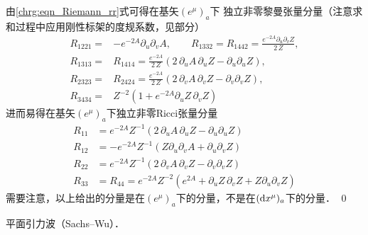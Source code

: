 \noindent {}
由\eqref{chrg:eqn_Riemann_rr}式可得在基矢$(e^\mu)_a$下
独立非零黎曼张量分量（注意求和过程中应用刚性标架的度规系数，见部分）
\begin{align*}
  R_{1221} =& -e^{-2 A} \partial_u\partial_v A, \qquad
  R_{1332} = R_{1442} = \frac{e^{-2A} \partial_u \partial_v Z }{{2}\, Z}, \\
  R_{1313} =& R_{1414}= \frac{e^{-2A}}{{2}\, Z} (2\, \partial_u A \,
    \partial_u Z  - \partial_u \partial_u Z ),  \\
  R_{2323} =& R_{2424} = \frac{e^{-2A}}{{2}\, Z}
    (2\, \partial_v A \, \partial_v Z - \partial_v \partial_v Z ),  \\
  R_{3434} =& Z^{-2} (1+ e^{-2A} \partial_u Z \,\partial_v Z )
\end{align*}
进而易得在基矢$(e^\mu)_a$下独立非零Ricci张量分量
\begin{align*}
  R_{11} &= e^{-2A} Z^{-1} ( 2\,\partial_u A \,\partial_u Z - \partial_u \partial_u Z)  \\
  R_{12} &=-e^{-2A} Z^{-1} ( Z\partial_u\partial_v A + \partial_u \partial_v Z )  \\
  R_{22} &= e^{-2A} Z^{-1} ( 2\,\partial_v A \,\partial_v Z - \partial_v \partial_v Z)  \\
  R_{33} &= R_{44}=e^{-2A}Z^{-2}(e^{2A}+\partial_u Z \,\partial_v Z + Z\partial_u \partial_v Z)
\end{align*}
需要注意，以上给出的分量是在$(e^\mu)_a$下的分量，不是在$({\rm d}x^\mu)_a$下的分量．
\qed

\begin{example}\label{chrg:exm_SWPlane}
	平面引力波（Sachs--Wu）．
\end{example}

